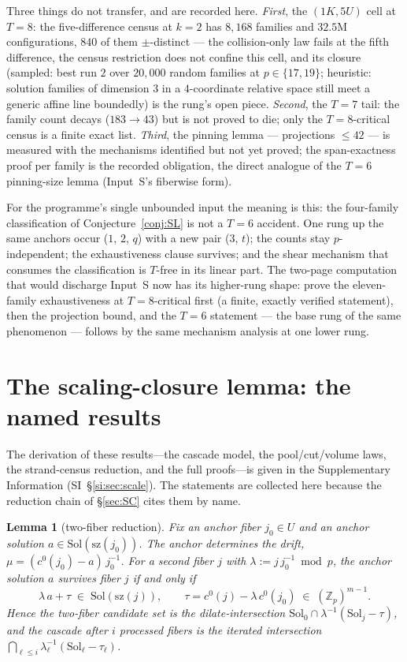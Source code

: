 \documentclass[11pt,a4paper]{article}
\numberwithin{equation}{section}
\theoremstyle{plain}
\theoremstyle{plain}
\newtheorem{lemma}[theorem]{Lemma}
\theoremstyle{definition}
\theoremstyle{remark}
\newcommand{\Z}{\mathbb{Z}}
\begin{document}
Three things do not transfer, and are recorded here. \emph{First}, the
$(1K,5U)$ cell at $T=8$: the five-difference census at $k=2$ has $8{,}168$
families and $32.5$M configurations, $840$ of them $\pm$-distinct --- the
collision-only law fails at the fifth difference, the census restriction
does not confine this cell, and its closure (sampled: best run $2$ over
$20{,}000$ random families at $p\in\{17,19\}$; heuristic: solution
families of dimension $3$ in a $4$-coordinate relative space still meet a
generic affine line boundedly) is the rung's open piece. \emph{Second},
the $T=7$ tail: the family count decays ($183\to43$) but is not proved
to die; only the $T=8$-critical census is a finite exact list.
\emph{Third}, the pinning lemma --- projections $\le42$ --- is measured
with the mechanisms identified but not yet proved; the span-exactness
proof per family is the recorded obligation, the direct analogue of the
$T=6$ pinning-size lemma (Input~S's fiberwise form).

For the programme's single unbounded input the meaning is this: the
four-family classification of Conjecture~\ref{conj:SL} is not a $T=6$
accident. One rung up the same anchors occur ($1$, $2$, $q$) with a new
pair ($3$, $t$); the counts stay $p$-independent; the exhaustiveness
clause survives; and the shear mechanism that consumes the
classification is $T$-free in its linear part. The two-page computation
that would discharge Input~S now has its higher-rung shape: prove the
eleven-family exhaustiveness at $T=8$-critical first (a finite, exactly
verified statement), then the projection bound, and the $T=6$ statement
--- the base rung of the same phenomenon --- follows by the same
mechanism analysis at one lower rung.

\section{The scaling-closure lemma: the named results}\label{sec:scale}

The derivation of these results---the cascade model, the pool/cut/volume laws,
the strand-census reduction, and the full proofs---is given in the Supplementary
Information (SI~\S\ref{si:sec:scale}). The statements are collected here because
the reduction chain of \S\ref{sec:SC} cites them by name.

\begin{lemma}[two-fiber reduction]\label{lem:twofiber}
Fix an anchor fiber $j_0\in U$ and an anchor solution
$a\in\mathrm{Sol}(\mathrm{sz}(j_0))$. The anchor determines the drift,
$\mu=(c^0(j_0)-a)\,j_0^{-1}$. For a second fiber $j$ with
$\lambda:=j\,j_0^{-1}\bmod p$, the anchor solution $a$ survives fiber
$j$ if and only if
\[
\lambda\,a+\tau\;\in\;\mathrm{Sol}(\mathrm{sz}(j)),
\qquad
\tau=c^0(j)-\lambda\,c^0(j_0)\;\in\;(\Z_p)^{m-1}.
\]
Hence the two-fiber candidate set is the dilate-intersection
$\mathrm{Sol}_0\cap\lambda^{-1}(\mathrm{Sol}_j-\tau)$, and the cascade
after $i$ processed fibers is the iterated intersection
$\bigcap_{\ell\le i}\lambda_\ell^{-1}(\mathrm{Sol}_\ell-\tau_\ell)$.
\end{lemma}
\end{document}
